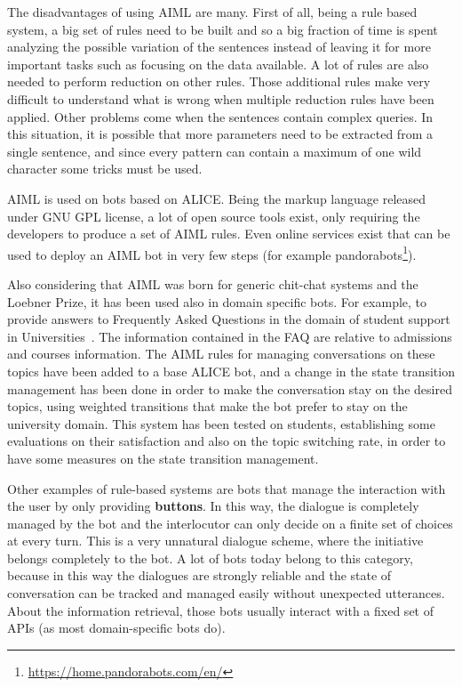 The disadvantages of using AIML are many. First of all, being a rule based system, a big set of rules need to be built and so a big fraction of time is spent analyzing the possible variation of the sentences instead of leaving it for more important tasks such as focusing on the data available. A lot of rules are also needed to perform reduction on other rules. Those additional rules make very difficult to understand what is wrong when multiple reduction rules have been applied. Other problems come when the sentences contain complex queries. In this situation, it is possible that more parameters need to be extracted from a single sentence, and since every pattern can contain a maximum of one wild character some tricks must be used.

AIML is used on bots based on ALICE. Being the markup language released under GNU GPL license, a lot of open source tools exist, only requiring the developers to produce a set of AIML rules. Even online services exist that can be used to deploy an AIML bot in very few steps (for example pandorabots\footnote{\url{https://home.pandorabots.com/en/}}).

Also considering that AIML was born for generic chit-chat systems and the Loebner Prize, it has been used also in domain specific bots. For example, to provide answers to Frequently Asked Questions in the domain of student support in Universities~\cite{ghose2013toward}. The information contained in the FAQ are relative to admissions and courses information. The AIML rules for managing conversations on these topics have been added to a base ALICE bot, and a change in the state transition management has been done in order to make the conversation stay on the desired topics, using weighted transitions that make the bot prefer to stay on the university domain. This system has been tested on students, establishing some evaluations on their satisfaction and also on the topic switching rate, in order to have some measures on the state transition management.

Other examples of rule-based systems are bots that manage the interaction with the user by only providing \textbf{buttons}. In this way, the dialogue is completely managed by the bot and the interlocutor can only decide on a finite set of choices at every turn. This is a very unnatural dialogue scheme, where the initiative belongs completely to the bot. A lot of bots today belong to this category, because in this way the dialogues are strongly reliable and the state of conversation can be tracked and managed easily without unexpected utterances. About the information retrieval, those bots usually interact with a fixed set of APIs (as most domain-specific bots do).

